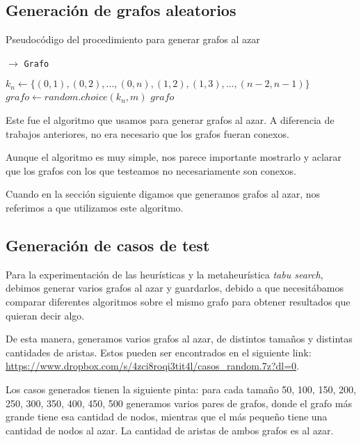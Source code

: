 
\subsection{Generación de grafos aleatorios}
\label{subsec:grafos-aleatorios}

\begin{algorithm}[H]
  \begin{algorithmic}[1]
  \caption{Pseudocódigo del procedimiento para generar grafos al azar}
  \label{algo:ap-1}
    $\rightarrow$ \texttt{Grafo}

    	\State $k_n \gets \{(0,1), (0,2), ..., (0,n), (1,2), (1,3), ..., (n-2, n-1)\}$
      \State $grafo \gets random.choice(k_n, m)$
      \Return $grafo$
		\EndProcedure
	\end{algorithmic}
\end{algorithm}


Este fue el algoritmo que usamos para generar grafos al azar. A diferencia de trabajos anteriores, no era necesario que los grafos fueran conexos.

Aunque el algoritmo es muy simple, nos parece importante mostrarlo y aclarar que los grafos con los que testeamos no necesariamente son conexos.

Cuando en la sección siguiente digamos que generamos grafos al azar, nos referimos a que utilizamos este algoritmo.

\subsection{Generación de casos de test}

Para la experimentación de las heurísticas y la metaheurística \emph{tabu search}, debimos generar varios grafos al azar y guardarlos, debido a que necesitábamos comparar diferentes algoritmos sobre el mismo grafo para obtener resultados que quieran decir algo.

De esta manera, generamos varios grafos al azar, de distintos tamaños y distintas cantidades de aristas. Estos pueden ser encontrados en el siguiente link: \url{https://www.dropbox.com/s/4zci8roqi3tit4l/casos_random.7z?dl=0}.

Los casos generados tienen la siguiente pinta: para cada tamaño 50, 100, 150, 200, 250, 300, 350, 400, 450, 500 generamos varios pares de grafos, donde el grafo más grande tiene esa cantidad de nodos, mientras que el más pequeño tiene una cantidad de nodos al azar. La cantidad de aristas de ambos grafos es al azar. 

